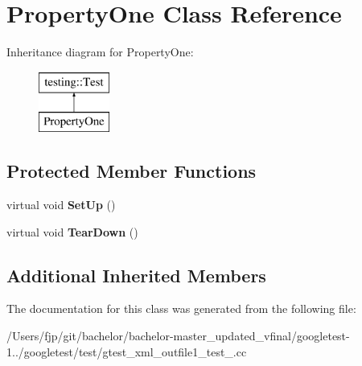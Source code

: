 \hypertarget{class_property_one}{}\section{Property\+One Class Reference}
\label{class_property_one}
Inheritance diagram for Property\+One\+:\begin{figure}[H]
\begin{center}
\leavevmode
\includegraphics[height=2.000000cm]{class_property_one}
\end{center}
\end{figure}
\subsection*{Protected Member Functions}
\begin{DoxyCompactItemize}
\item 
\mbox{\label{class_property_one_a9cb7d7cb508d5f1a6fc7cfead81ebc2b}} 
virtual void {\bfseries Set\+Up} ()
\item 
\mbox{\label{class_property_one_a3ed895113848403d5ea27f52a1bb0545}} 
virtual void {\bfseries Tear\+Down} ()
\end{DoxyCompactItemize}
\subsection*{Additional Inherited Members}


The documentation for this class was generated from the following file\+:\begin{DoxyCompactItemize}
\item 
/\+Users/fjp/git/bachelor/bachelor-\/master\+\_\+updated\+\_\+vfinal/googletest-\/1../googletest/test/gtest\+\_\+xml\+\_\+outfile1\+\_\+test\+\_\+.\+cc\end{DoxyCompactItemize}

